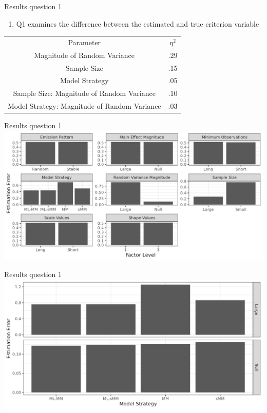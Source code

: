 \documentclass[
  ignorenonframetext,
]{beamer}
\providecommand{\tightlist}{%
  \setlength{\itemsep}{0pt}\setlength{\parskip}{0pt}}
\begin{document}
\begin{frame}{Results question 1}
\label{results-question-1}
\begin{enumerate}
\tightlist
\item
  Q1 examines the difference between the estimated and true criterion
  variable
\end{enumerate}

\begin{table}
    \centering
    \begin{tabular}{cc}
        Parameter & \(\eta^2\) \\
        Magnitude of Random Variance & .29 \\
        Sample Size & .15\\
        Model Strategy & .05 \\
        Sample Size: Magnitude of Random Variance & .10 \\
        Model Strategy: Magnitude of Random Variance & .03 \\
    \end{tabular}
\end{table}
\end{frame}

\begin{frame}{Results question 1}
\label{results-question-1-1}
\includegraphics{figures/anova1MainEffect.png}
\end{frame}

\begin{frame}{Results question 1}
\label{results-question-1-2}
\includegraphics{figures/anova1TwoWay1.png}
\end{frame}
\end{document}
